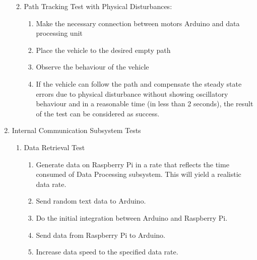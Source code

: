 \documentclass[a4paper,12pt]{article}
\begin{document}
\begin{enumerate}
\begin{enumerate}
\begin{enumerate}
\end{enumerate}



\item Path Tracking Test with Physical Disturbances: \label{test:f}	

\begin{enumerate}

\item Make the necessary connection between motors Arduino and data processing unit  

\item Place the vehicle to the desired empty path   

\item Observe the behaviour of the vehicle  

\item If the vehicle can follow the path and compensate the steady state errors due to physical disturbance without showing oscillatory behaviour and in a reasonable time (in less than 2 seconds), the result of the test can be considered as success.  

\end{enumerate}


\end{enumerate}




\item {Internal Communication Subsystem Tests}

\begin{enumerate}

\item Data Retrieval Test

\begin{enumerate}

\item Generate data on Raspberry Pi in a rate that reflects the time consumed of Data Processing subsystem. This will yield a realistic data rate.  

\item Send random text data to Arduino.  

\item Do the initial integration between Arduino and Raspberry Pi.  

\item Send data from Raspberry Pi to Arduino.  

\item Increase data speed to the specified data rate.  


\end{enumerate}
\end{enumerate}
\end{enumerate}
\end{document}
